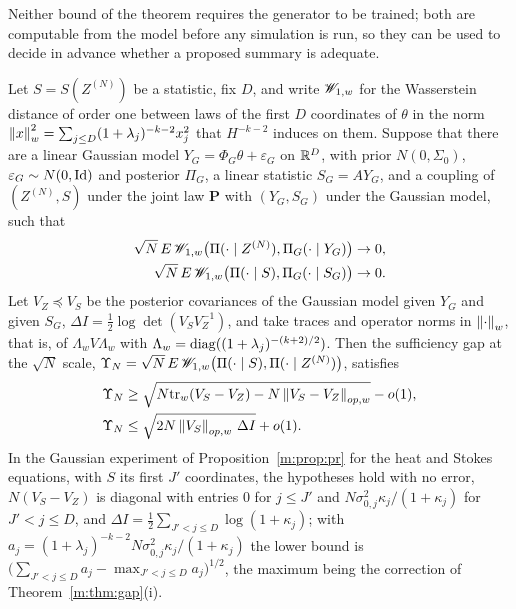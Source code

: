 Neither bound of the theorem requires the generator to be trained; both are computable from the model before any simulation is run, so they can be used to decide in advance whether a proposed summary is adequate.

\begin{proposition}\label{m:prop:gapnl}
Let $S=S(Z^{(N)})$ be a statistic, fix $D$, and write $\mathscr{W}_{1,w}$ for the Wasserstein distance of order one between laws of the first $D$ coordinates of $\theta$ in the norm $\left\|x\right\|_w^2=\sum_{j\le D}(1+\lambda_j)^{-k-2}x_j^2$ that $H^{-k-2}$ induces on them. Suppose that there are a linear Gaussian model $Y_G=\Phi_G\theta+\varepsilon_G$ on $\mathbb{R}^D$, with prior $N(0,\Sigma_0)$, $\varepsilon_G\sim N(0,\operatorname{Id})$ and posterior $\Pi_G$, a linear statistic $S_G=AY_G$, and a coupling of $(Z^{(N)},S)$ under the joint law $\mathbf P$ with $(Y_G,S_G)$ under the Gaussian model, such that
\[
\begin{aligned}
\sqrt N\,E\,\mathscr{W}_{1,w}\big(\Pi(\cdot\mid Z^{(N)}),\Pi_G(\cdot\mid Y_G)\big)&\to0,\\
\sqrt N\,E\,\mathscr{W}_{1,w}\big(\Pi(\cdot\mid S),\Pi_G(\cdot\mid S_G)\big)&\to0 .
\end{aligned}
\]
Let $V_Z\preceq V_S$ be the posterior covariances of the Gaussian model given $Y_G$ and given $S_G$, $\Delta I=\tfrac12\log\det(V_SV_Z^{-1})$, and take traces and operator norms in $\left\|\cdot\right\|_w$, that is, of $\Lambda_wV\Lambda_w$ with $\Lambda_w=\operatorname{diag}((1+\lambda_j)^{-(k+2)/2})$. Then the sufficiency gap at the $\sqrt N$ scale, $\Upsilon_N=\sqrt N\,E\,\mathscr{W}_{1,w}\big(\Pi(\cdot\mid S),\Pi(\cdot\mid Z^{(N)})\big)$, satisfies
\[
\begin{aligned}
\Upsilon_N&\ge\sqrt{N\mathrm{tr}_w(V_S-V_Z)-N\left\|V_S-V_Z\right\|_{op,w}}-o(1),\\
\Upsilon_N&\le\sqrt{2N\left\|V_S\right\|_{op,w}\,\Delta I}+o(1).
\end{aligned}
\]
In the Gaussian experiment of Proposition~\ref{m:prop:pr} for the heat and Stokes equations, with $S$ its first $J'$ coordinates, the hypotheses hold with no error, $N(V_S-V_Z)$ is diagonal with entries $0$ for $j\le J'$ and $N\sigma_{0,j}^2\kappa_j/(1+\kappa_j)$ for $J'<j\le D$, and $\Delta I=\tfrac12\sum_{J'<j\le D}\log(1+\kappa_j)$; with $a_j=(1+\lambda_j)^{-k-2}N\sigma_{0,j}^2\kappa_j/(1+\kappa_j)$ the lower bound is $\big(\sum_{J'<j\le D}a_j-\max_{J'<j\le D}a_j\big)^{1/2}$, the maximum being the correction of Theorem~\ref{m:thm:gap}(i).
\end{proposition}

